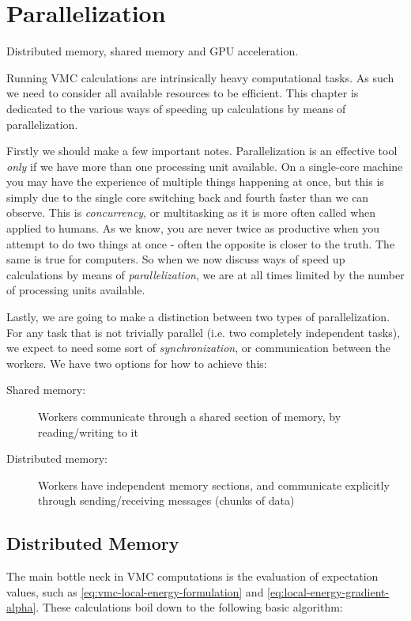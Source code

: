 \documentclass[Thesis.tex]{subfiles}
\begin{document}
\chapter{Parallelization}
\label{chp:parallelization}

Distributed memory, shared memory and GPU acceleration.

Running VMC calculations are intrinsically heavy computational tasks. As such we
need to consider all available resources to be efficient. This chapter is
dedicated to the various ways of speeding up calculations by means of
parallelization.

Firstly we should make a few important notes. Parallelization is an effective
tool \emph{only} if we have more than one processing unit available. On a
single-core machine you may have the experience of multiple things
happening at once, but this is simply due to the single core switching back and
fourth faster than we can observe. This is \emph{concurrency}, or multitasking
as it is more often called when applied to humans. As we know, you are never
twice as productive when you attempt to do two things at once - often the
opposite is closer to the truth. The same is true for computers. So when we now
discuss ways of speed up calculations by means of \emph{parallelization}, we are
at all times limited by the number of processing units available.

Lastly, we are going to make a distinction between two types of parallelization.
For any task that is not trivially parallel (i.e. two completely independent
tasks), we expect to need some sort of \emph{synchronization}, or communication
between the workers. We have two options for how to achieve this:

\begin{description}
\item[Shared memory:] Workers communicate through a shared section of memory, by
  reading/writing to it
  \item[Distributed memory:] Workers have independent memory sections, and
    communicate explicitly through sending/receiving messages (chunks of data)
\end{description}

\section{Distributed Memory}

The main bottle neck in VMC computations is the evaluation of expectation
values, such as \cref{eq:vmc-local-energy-formulation} and
\cref{eq:local-energy-gradient-alpha}. These calculations boil down to the
following basic algorithm:
\end{document}
